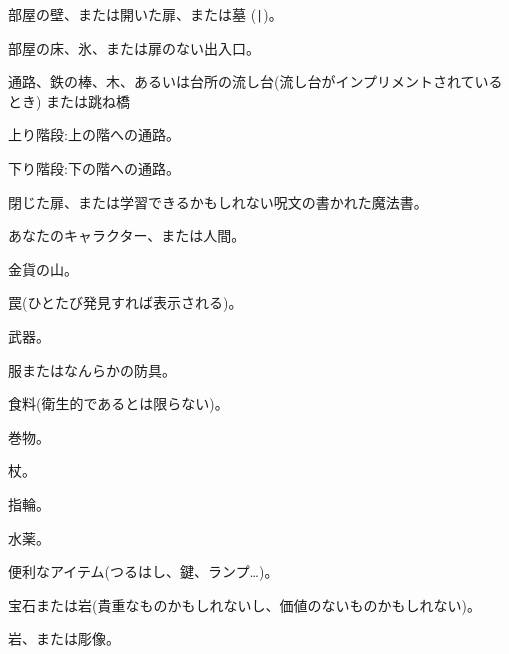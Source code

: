 \blist{}
\item[\tb{"- と |}]
部屋の壁、または開いた扉、または墓 ({\tt |})。
\item[\tb{.}]
部屋の床、氷、または扉のない出入口。
\item[\tb{\#}]
通路、鉄の棒、木、あるいは台所の流し台(流し台がインプリメントされているとき)
または跳ね橋
\item[\tb{>}]
上り階段:上の階への通路。
\item[\tb{<}]
下り階段:下の階への通路。
\item[\tb{+}]
閉じた扉、または学習できるかもしれない呪文の書かれた魔法書。
\item[\tb{@}]
あなたのキャラクター、または人間。
\item[\tb{\$}]
金貨の山。
\item[\tb{\^}]
罠(ひとたび発見すれば表示される)。
\item[\tb{)}]
武器。
\item[\tb{[}]
服またはなんらかの防具。
\item[\tb{\%}]
食料(衛生的であるとは限らない)。
\item[\tb{?}]
巻物。
\item[\tb{/}]
杖。
\item[\tb{=}]
指輪。
\item[\tb{!}]
水薬。
\item[\tb{(}]
便利なアイテム(つるはし、鍵、ランプ…)。
\item[\tb{"}]
\item[\tb{*}]
宝石または岩(貴重なものかもしれないし、価値のないものかもしれない)。
\item[\tb{\`}]
岩、または彫像。
\item[\tb{0}]
